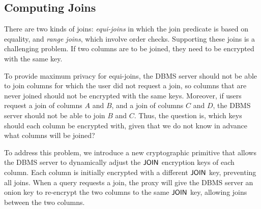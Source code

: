 
\subsection{Computing Joins}
\label{ss:join}

There are two kinds of joins: {\em equi-joins} in which
the join predicate is based on equality, and {\em range joins}, which
involve order checks.
Supporting these joins is a challenging problem.  If two columns are
to be joined, they need to be encrypted with the same key.



To provide maximum privacy for equi-joins, the DBMS server should not
be able to join columns for which the user did not request a join, so
columns that are never joined should not be encrypted with the same
keys.  Moreover, if users request a join of columns $A$
and $B$, and a join of columns $C$ and $D$, the DBMS server should not
be able to join $B$ and $C$\@.  Thus, the question is, which keys
should each column be encrypted with, given that we do not know in
advance what columns will be joined?

To address this problem, we introduce a new cryptographic primitive
that allows the DBMS server to dynamically adjust the $\mathsf{JOIN}$
encryption keys of each column.  Each column is initially encrypted
with a different $\mathsf{JOIN}$ key, preventing all joins.  When a query
requests a join, the proxy will give the DBMS server an onion key to
re-encrypt the two columns to the same $\mathsf{JOIN}$ key, allowing joins
between the two columns.

